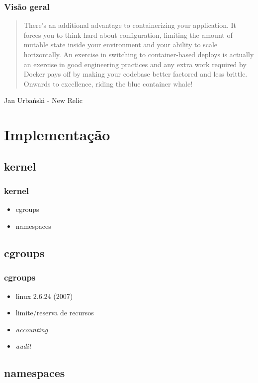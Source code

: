 \documentclass{beamer}
\begin{document}
\begin{frame}
    \frametitle{Visão geral}
    \begin{quote}
        There’s an additional advantage to containerizing your application. It
        forces you to think hard about configuration, limiting the amount of
        mutable state inside your environment and your ability to scale
        horizontally. An exercise in switching to container-based deploys is
        actually an exercise in good engineering practices and any extra work
        required by Docker pays off by making your codebase better factored and
        less brittle. Onwards to excellence, riding the blue container whale!
    \end{quote}
    Jan Urbański - New Relic
\end{frame}

\section{Implementação}

\subsection{kernel}

\begin{frame}
    \frametitle{kernel}
    \begin{itemize}
        \item cgroups
        \item namespaces
    \end{itemize}
\end{frame}

\subsection{cgroups}

\begin{frame}
    \frametitle{cgroups}
    \begin{itemize}
        \item linux 2.6.24 (2007)
        \item limite/reserva de recursos
        \item \textit{accounting}
        \item \textit{audit}
    \end{itemize}
\end{frame}

\subsection{namespaces}
\end{document}
